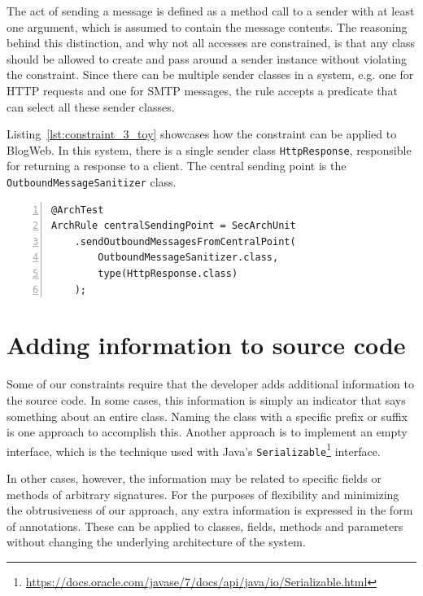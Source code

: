 The act of sending a message is defined as a method call to a sender with at least one argument, which is assumed to contain the message contents. The reasoning behind this distinction, and why not all accesses are constrained, is that any class should be allowed to create and pass around a sender instance without violating the constraint.
Since there can be multiple sender classes in a system, e.g. one for HTTP requests and one for SMTP messages, the rule accepts a predicate that can select all these sender classes.

Listing~\ref{lst:constraint_3_toy} showcases how the constraint can be applied to BlogWeb. In this system, there is a single sender class \texttt{HttpResponse}, responsible for returning a response to a client. The central sending point is the \texttt{OutboundMessageSanitizer} class. 

\begin{minipage}{\linewidth}
\begin{lstlisting}[caption={Application of constraint 3 to BlogWeb.}, captionpos=b, label=lst:constraint_3_toy, numbers=left]
@ArchTest
ArchRule centralSendingPoint = SecArchUnit
    .sendOutboundMessagesFromCentralPoint(
        OutboundMessageSanitizer.class,
        type(HttpResponse.class)
    );
\end{lstlisting}
\end{minipage}




\section{Adding information to source code}

Some of our constraints require that the developer adds additional information to the source code. In some cases, this information is simply an indicator that says something about an entire class. Naming the class with a specific prefix or suffix is one approach to accomplish this. Another approach is to implement an empty interface, which is the technique used with Java's \texttt{Serializable}\footnote{\url{https://docs.oracle.com/javase/7/docs/api/java/io/Serializable.html}} interface. 

In other cases, however, the information may be related to specific fields or methods of arbitrary signatures. For the purposes of flexibility and minimizing the obtrusiveness of our approach, any extra information is expressed in the form of annotations. These can be applied to classes, fields, methods and parameters without changing the underlying architecture of the system.


